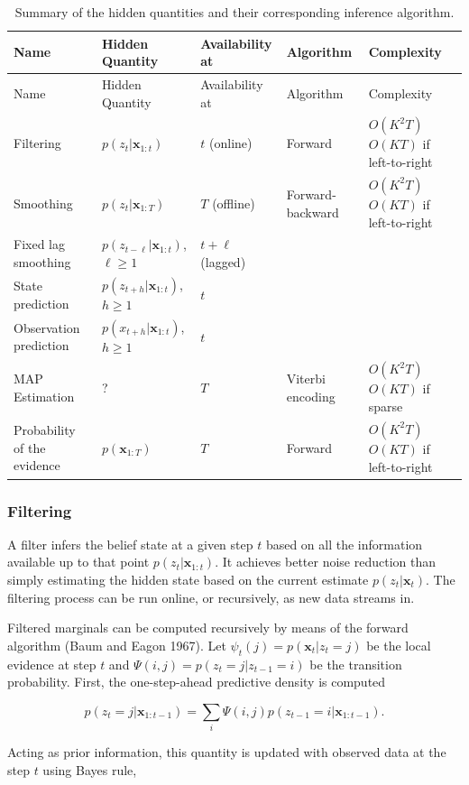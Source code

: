 \documentclass[]{article}
\newcommand{\mat}[1]{\mathbf{#1}}
\begin{document}
\begin{longtable}[]{@{}lllll@{}}
\caption{Summary of the hidden quantities and their corresponding
inference algorithm.}\tabularnewline
\toprule
Name & Hidden Quantity & Availability at & Algorithm &
Complexity\tabularnewline
\midrule
\endfirsthead
\toprule
Name & Hidden Quantity & Availability at & Algorithm &
Complexity\tabularnewline
\midrule
\endhead
Filtering & \(p(z_t | \mat{x}_{1:t})\) & \(t\) (online) & Forward &
\(O(K^2T)\) ~\(O(KT)\) if left-to-right\tabularnewline
Smoothing & \(p(z_t | \mat{x}_{1:T})\) & \(T\) (offline) &
Forward-backward & \(O(K^2T)\) ~\(O(KT)\) if
left-to-right\tabularnewline
Fixed lag smoothing & \(p(z_{t - \ell} | \mat{x}_{1:t})\),
\(\ell \ge 1\) & \(t + \ell\) (lagged) & &\tabularnewline
State prediction & \(p(z_{t+h} | \mat{x}_{1:t})\), \(h\ge 1\) & \(t\) &
&\tabularnewline
Observation prediction & \(p(x_{t+h} | \mat{x}_{1:t})\), \(h\ge 1\) &
\(t\) & &\tabularnewline
MAP Estimation & ? & \(T\) & Viterbi encoding & \(O(K^2T)\) ~\(O(KT)\)
if sparse\tabularnewline
Probability of the evidence & \(p(\mat{x}_{1:T})\) & \(T\) & Forward &
\(O(K^2T)\) ~\(O(KT)\) if left-to-right\tabularnewline
\bottomrule
\end{longtable}

\normalsize

\subsubsection{Filtering}\label{filtering}

A filter infers the belief state at a given step \(t\) based on all the
information available up to that point \(p(z_t | \mat{x}_{1:t})\). It
achieves better noise reduction than simply estimating the hidden state
based on the current estimate \(p(z_t | \mat{x}_{t})\). The filtering
process can be run online, or recursively, as new data streams in.

Filtered marginals can be computed recursively by means of the forward
algorithm (Baum and Eagon 1967). Let
\(\psi_t(j) = p(\mat{x}_t | z_t = j)\) be the local evidence at step
\(t\) and \(\Psi(i, j) = p(z_t = j | z_{t-1} = i)\) be the transition
probability. First, the one-step-ahead predictive density is computed

\[
p(z_t = j | \mat{x}_{1:t-1}) = \sum_{i}{\Psi(i, j) p(z_{t-1} = i | \mat{x}_{1:t-1})}.
\]

Acting as prior information, this quantity is updated with observed data
at the step \(t\) using Bayes rule,
\end{document}
